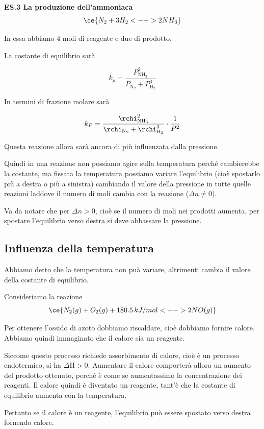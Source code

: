 \vspace{0.2cm}\textbf{ES.3 La produzione dell'ammoniaca}
$$\ce{N_2 + 3H_2 <--> 2NH_3}$$

In essa abbiamo 4 moli di reagente e due di prodotto.

La costante di equilibrio sarà

$$k_p = \frac{P_{\text{NH}_3}^2}{P_{\text{N}_2} + P_{\text{H}_2}^3}$$

In termini di frazione molare sarà

$$k_P = \frac{\rchi_{\text{NH}_3}^2}{\rchi_{\text{N}_2} + \rchi_{\text{H}_2}^3} \cdot \frac{1}{P^2}$$

Questa reazione allora sarà ancora di più influenzata dalla pressione.

\vspace{0.2cm}Quindi in una reazione non possiamo agire sulla temperatura perché cambierebbe la costante, ma fissata la temperatura possiamo variare l'equilibrio (cioè spostarlo più a destra o più a sinistra) cambiando il valore della pressione in tutte quelle reazioni laddove il numero di moli cambia con la reazione ($\Delta n \neq 0$).

\vspace{0.2cm}Va da notare che per $\Delta n > 0$, cioè se il numero di moli nei prodotti aumenta, per spostare l'equilibrio verso destra si deve abbassare la pressione.

\subsection{Influenza della temperatura}
Abbiamo detto che la temperatura non puà variare, altrimenti cambia il valore della costante di equilibrio.

Consideriamo la reazione
$$\ce{N_2(g) + O_2(g) + 180.5 \, kJ/mol <--> 2NO(g)}$$

Per ottenere l'ossido di azoto dobbiamo riscaldare, cioè dobbiamo fornire calore. Abbiamo quindi immaginato che il calore sia un reagente.

Siccome questo processo richiede assorbimento di calore, cioè è un processo endotermico, si ha $\Delta$H$>0$. Aumentare il calore comporterà allora un aumento del prodotto ottenuto, perché è come se aumentassimo la concentrazione dei reagenti. Il calore quindi è diventato un reagente, tant'è che la costante di equilibrio aumenta con la temperatura.

Pertanto se il calore è un reagente, l'equilibrio può essere spostato verso destra fornendo calore.

